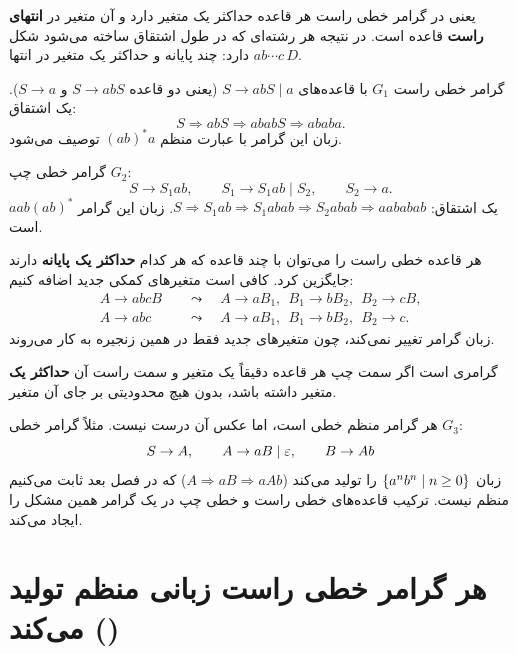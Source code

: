 یعنی در گرامر خطی راست هر قاعده حداکثر یک متغیر دارد و آن متغیر در \textbf{انتهای راست} قاعده است. در نتیجه هر رشته‌ای که در طول اشتقاق ساخته می‌شود شکل $ab\cdots c\,D$ دارد: چند پایانه و حداکثر یک متغیر در انتها.

\begin{example}
گرامر خطی راست $G_1$ با قاعده‌های $S\to abS\mid a$ (یعنی دو قاعده $S\to abS$ و $S\to a$). یک اشتقاق:
\[S\Rightarrow abS\Rightarrow ababS\Rightarrow ababa.\]
زبان این گرامر با عبارت منظم $(ab)^*a$ توصیف می‌شود.
\end{example}

\begin{example}
گرامر خطی چپ $G_2$:
\[S\to S_1ab,\qquad S_1\to S_1ab\mid S_2,\qquad S_2\to a.\]
یک اشتقاق: $S\Rightarrow S_1ab\Rightarrow S_1abab\Rightarrow S_2abab\Rightarrow aababab$. زبان این گرامر $aab(ab)^*$ است.
\end{example}

\begin{note}
هر قاعده خطی راست را می‌توان با چند قاعده که هر کدام \textbf{حداکثر یک پایانه} دارند جایگزین کرد. کافی است متغیرهای کمکی جدید اضافه کنیم:
\begin{align*}
A\to abcB\quad&\leadsto\quad A\to aB_1,\ \ B_1\to bB_2,\ \ B_2\to cB,\\
A\to abc\quad&\leadsto\quad A\to aB_1,\ \ B_1\to bB_2,\ \ B_2\to c.
\end{align*}
زبان گرامر تغییر نمی‌کند، چون متغیرهای جدید فقط در همین زنجیره به کار می‌روند.
\end{note}

\begin{definition}
گرامری  است اگر سمت چپ هر قاعده دقیقاً یک متغیر و سمت راست آن \textbf{حداکثر یک} متغیر داشته باشد، بدون هیچ محدودیتی بر جای آن متغیر.
\end{definition}

هر گرامر منظم خطی است، اما عکس آن درست نیست. مثلاً گرامر خطی $G_3$:
\[S\to A,\qquad A\to aB\mid\varepsilon,\qquad B\to Ab\]
زبان $\{a^nb^n\mid n\ge0\}$ را تولید می‌کند ($A\Rightarrow aB\Rightarrow aAb$) که در فصل بعد ثابت می‌کنیم منظم نیست. ترکیب قاعده‌های خطی راست و خطی چپ در یک گرامر همین مشکل را ایجاد می‌کند.

\section{هر گرامر خطی راست زبانی منظم تولید می‌کند ()}

